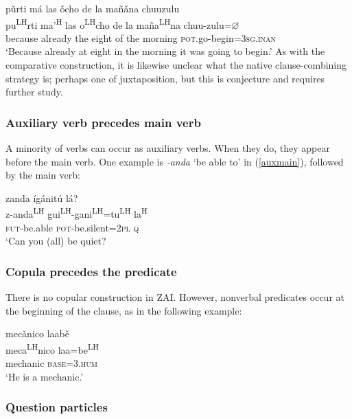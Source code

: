 \ea\label{purti}
\glll p\v{u}rti má las \v{o}cho de la mañ\v{a}na chuuzulu \\
pu\textsuperscript{LH}rti ma'\textsuperscript{H} las o\textsuperscript{LH}cho de la maña\textsuperscript{LH}na chuu-zulu=$\varnothing$ \\
because already the eight of the morning \textsc{pot}.go-begin=\textsc{3sg.inan} \\
\glt `Because already at eight in the morning it was going to begin.'
\z
As with the comparative construction, it is likewise unclear what the native clause-combining strategy is; perhaps one of juxtaposition, but this is conjecture and requires further study.





\subsubsection{Auxiliary verb precedes main verb}
	
A minority of verbs can occur as auxiliary verbs. When they do, they appear before the main verb. One example is \textit{-anda} `be able to' in (\ref{auxmain}), followed by the main verb:

\ea\label{auxmain}
zanda \'{i}gánit\'{u} lá? \\
z-anda\textsuperscript{LH} gui\textsuperscript{LH}-gani\textsuperscript{LH}=tu\textsuperscript{LH} la\textsuperscript{H} \\
\textsc{fut}-be.able \textsc{pot}-be.silent=\textsc{2pl} \textsc{q} \\
\glt `Can you (all) be quiet?
\z


\newpage 
\subsubsection{Copula precedes the predicate} 

There is no copular construction in ZAI. However, nonverbal predicates occur at the beginning of the clause, as in the following example:

\ea
\glll mec\v{a}nico laab\v{e} \\
meca\textsuperscript{LH}nico laa=be\textsuperscript{LH} \\
mechanic \textsc{base}=\textsc{3.hum} \\
\glt `He is a mechanic.'
\z



\subsubsection{Question particles}

